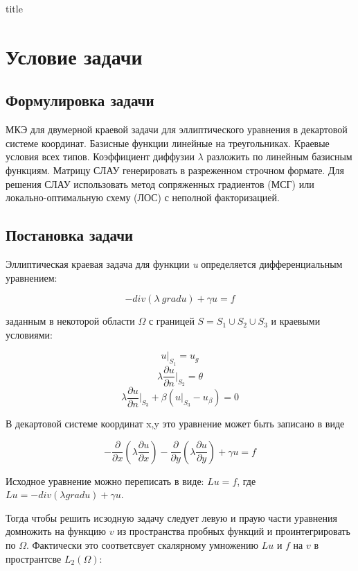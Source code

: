 \documentclass[12pt,a4paper]{article}
\begin{document}
{title}

\section{Условие задачи}                %
\subsection*{Формулировка задачи}       %

МКЭ для двумерной краевой задачи для эллиптического уравнения в декартовой системе
координат. Базисные функции линейные на треугольниках. Краевые условия всех типов.
Коэффициент диффузии $\lambda$ разложить по линейным базисным функциям. Матрицу СЛАУ
генерировать в разреженном строчном формате. Для решения СЛАУ использовать метод
сопряженных градиентов (МСГ) или локально-оптимальную схему (ЛОС) с неполной
факторизацией.

\subsection*{Постановка задачи}

Эллиптическая краевая задача для функции \textit{u}
определяется дифференциальным уравнением:

\[ -div( \lambda \ grad u) + \gamma u = f \]

\noindent заданным в некоторой области $\Omega$ с границей
$S=S_1 \cup S_2 \cup S_3$ и краевыми условиями:

\[ u \vert_{S_1} = u_g \]
\[ \lambda \frac{\partial u}{\partial n} \bigg\vert_{S_2} = \theta \]
\[ \lambda \frac{\partial u}{\partial n} \bigg\vert_{S_3}
    + \beta(u \vert_{S_3} - u_{\beta}) = 0 \]

\noindent В декартовой системе координат {x,y} это
уравнение может быть записано в виде

\[ -\frac{\partial}{\partial x}
    \left( \lambda \frac{\partial u}{\partial x} \right)
    -\frac{\partial}{\partial y}
    \left( \lambda \frac{\partial u}{\partial y} \right)
    + \gamma u = f \]

\noindent Исходное уравнение можно переписать
в виде: $Lu = f$, где $Lu = -div( \lambda grad u) + \gamma u$.

\noindent Тогда чтобы решить исзодную задачу
следует левую и праую части уравнения домножить
на функцию $v$ из пространства пробных функций
и проинтегрировать по $\Omega$. Фактически это
соответсвует скалярному умножению $Lu$ и $f$
на $v$ в пространтсве $L_2(\Omega)$:
\end{document}
